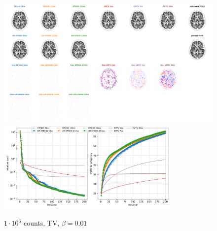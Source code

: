 \begin{figure}
  \centering
    \includegraphics[width=1.0\textwidth]{./figs/brain2d_counts_1.0E+06_seed_1_beta_1.0E-02_prior_TV_niter_ref_20000_fwhm_4.5_4.5_niter_200.png}
    \includegraphics[width=0.8\textwidth]{./figs/brain2d_counts_1.0E+06_seed_1_beta_1.0E-02_prior_TV_niter_ref_20000_fwhm_4.5_4.5_niter_200_metrics.pdf}
  \caption{$1\cdot10^6$ counts, TV, $\beta = 0.01$}
  \label{fig:metrics}
\end{figure}


